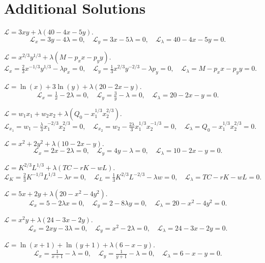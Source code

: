 \section{Additional Solutions}

\begin{solutions}
  \item $\mathcal{L} = 3 x y + \lambda(40 - 4 x - 5 y)$.
  \[
  \mathcal{L}_x = 3 y - 4 \lambda = 0, \quad \mathcal{L}_y = 3 x - 5 \lambda = 0, \quad \mathcal{L}_\lambda = 40 - 4 x - 5 y = 0.
  \]
  \item $\mathcal{L} = x^{2/3} y^{1/3} + \lambda(M - p_x x - p_y y)$.
  \[
  \mathcal{L}_x = \tfrac{2}{3} x^{-1/3} y^{1/3} - \lambda p_x = 0, \quad \mathcal{L}_y = \tfrac{1}{3} x^{2/3} y^{-2/3} - \lambda p_y = 0, \quad \mathcal{L}_\lambda = M - p_x x - p_y y = 0.
  \]
  \item $\mathcal{L} = \ln(x) + 3 \ln(y) + \lambda(20 - 2 x - y)$.
  \[
  \mathcal{L}_x = \tfrac{1}{x} - 2 \lambda = 0, \quad \mathcal{L}_y = \tfrac{3}{y} - \lambda = 0, \quad \mathcal{L}_\lambda = 20 - 2 x - y = 0.
  \]
  \item $\mathcal{L} = w_1 x_1 + w_2 x_2 + \lambda(Q_0 - x_1^{1/3} x_2^{2/3})$.
  \[
  \mathcal{L}_{x_1} = w_1 - \tfrac{\lambda}{3} x_1^{-2/3} x_2^{2/3} = 0, \quad \mathcal{L}_{x_2} = w_2 - \tfrac{2 \lambda}{3} x_1^{1/3} x_2^{-1/3} = 0, \quad \mathcal{L}_\lambda = Q_0 - x_1^{1/3} x_2^{2/3} = 0.
  \]
  \item $\mathcal{L} = x^2 + 2 y^2 + \lambda(10 - 2 x - y)$.
  \[
  \mathcal{L}_x = 2 x - 2 \lambda = 0, \quad \mathcal{L}_y = 4 y - \lambda = 0, \quad \mathcal{L}_\lambda = 10 - 2 x - y = 0.
  \]
  \item $\mathcal{L} = K^{2/3} L^{1/3} + \lambda(TC - r K - w L)$.
  \[
  \mathcal{L}_K = \tfrac{2}{3} K^{-1/3} L^{1/3} - \lambda r = 0, \quad \mathcal{L}_L = \tfrac{1}{3} K^{2/3} L^{-2/3} - \lambda w = 0, \quad \mathcal{L}_\lambda = TC - r K - w L = 0.
  \]
  \item $\mathcal{L} = 5 x + 2 y + \lambda(20 - x^2 - 4 y^2)$.
  \[
  \mathcal{L}_x = 5 - 2 \lambda x = 0, \quad \mathcal{L}_y = 2 - 8 \lambda y = 0, \quad \mathcal{L}_\lambda = 20 - x^2 - 4 y^2 = 0.
  \]
  \item $\mathcal{L} = x^2 y + \lambda(24 - 3 x - 2 y)$.
  \[
  \mathcal{L}_x = 2 x y - 3 \lambda = 0, \quad \mathcal{L}_y = x^2 - 2 \lambda = 0, \quad \mathcal{L}_\lambda = 24 - 3 x - 2 y = 0.
  \]
  \item $\mathcal{L} = \ln(x + 1) + \ln(y + 1) + \lambda(6 - x - y)$.
  \[
  \mathcal{L}_x = \tfrac{1}{x + 1} - \lambda = 0, \quad \mathcal{L}_y = \tfrac{1}{y + 1} - \lambda = 0, \quad \mathcal{L}_\lambda = 6 - x - y = 0.
\]
\end{solutions}
